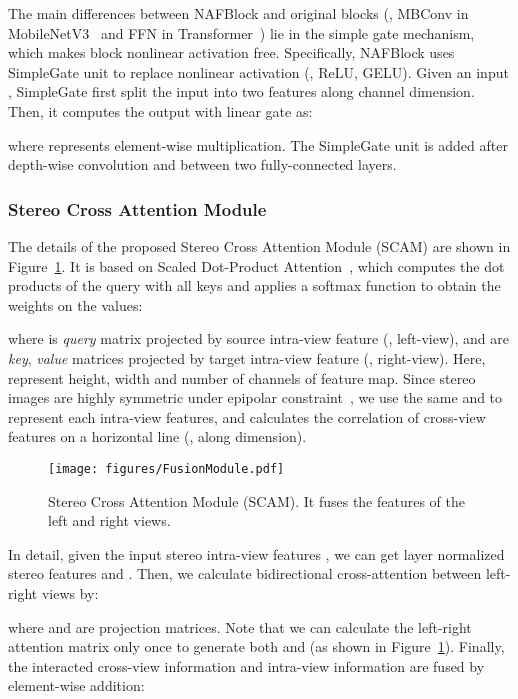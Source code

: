 \documentclass[10pt,twocolumn,letterpaper]{article}
\begin{document}
The main differences between NAFBlock and original blocks (\eg, MBConv in MobileNetV3~\cite{howard2019searching} and FFN in Transformer~\cite{vaswani2017attention}) lie in the simple gate mechanism, which makes block nonlinear activation free. Specifically, NAFBlock uses SimpleGate unit to replace nonlinear activation (\eg, ReLU, GELU). 
Given an input , SimpleGate first split the input into two features  along channel dimension. Then, it computes the output with linear gate as:

where  represents element-wise multiplication. The SimpleGate unit is added after depth-wise convolution and between two fully-connected layers.

\subsubsection{Stereo Cross Attention Module}\label{sec:fusion}
The details of the proposed Stereo Cross Attention Module (SCAM) are shown in Figure~\ref{fig.attention}.
It is based on Scaled Dot-Product Attention~\cite{vaswani2017attention}, which computes the dot products of the query with all keys and applies a softmax function to obtain the weights on the values:

where  is \textit{query} matrix projected by source intra-view feature (\eg, left-view), and  are \textit{key}, \textit{value} matrices projected by target intra-view feature (\eg, right-view). Here,  represent height, width and number of channels of feature map.
Since stereo images are highly symmetric under epipolar constraint~\cite{wang2021symmetric}, we use the same  and  to represent each intra-view features, and calculates the correlation of cross-view features on a horizontal line (\ie, along  dimension).
\begin{figure}[t]
\centering
\texttt{[image: figures/FusionModule.pdf]}
\vspace{-2mm}
\caption{Stereo Cross Attention Module (SCAM). It fuses the features of the left and right views.
}
\vspace{-2mm}
\label{fig.attention}
\end{figure}
In detail, given the input stereo intra-view features , we can get layer normalized stereo features  and . 
Then, we calculate bidirectional cross-attention between left-right views by:

where  and  are projection matrices.
Note that we can calculate the left-right attention matrix only once to generate both  and  (as shown in Figure~\ref{fig.attention}).
Finally, the interacted cross-view information  and intra-view information  are fused by element-wise addition:
\end{document}
